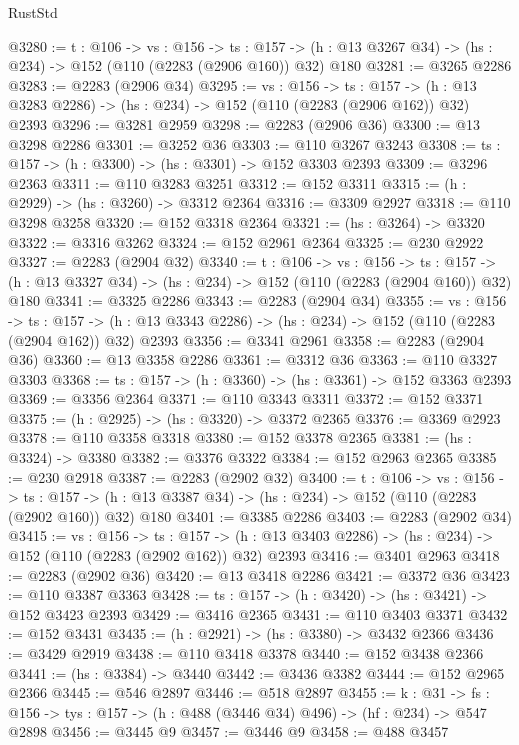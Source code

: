 \begin{lexlean}{RustStd}
\begin{coremodule}
@3280 := {t : @106} ->
  {vs : @156} ->
  {ts : @157} -> (h : @13 @3267 @34) -> (hs : @234) -> @152 (@110 (@2283 (@2906 @160)) @32) @180
@3281 := @3265 @2286
@3283 := @2283 (@2906 @34)
@3295 := {vs : @156} ->
  {ts : @157} -> (h : @13 @3283 @2286) -> (hs : @234) -> @152 (@110 (@2283 (@2906 @162)) @32) @2393
@3296 := @3281 @2959
@3298 := @2283 (@2906 @36)
@3300 := @13 @3298 @2286
@3301 := @3252 @36
@3303 := @110 @3267 @3243
@3308 := {ts : @157} -> (h : @3300) -> (hs : @3301) -> @152 @3303 @2393
@3309 := @3296 @2363
@3311 := @110 @3283 @3251
@3312 := @152 @3311
@3315 := (h : @2929) -> (hs : @3260) -> @3312 @2364
@3316 := @3309 @2927
@3318 := @110 @3298 @3258
@3320 := @152 @3318 @2364
@3321 := (hs : @3264) -> @3320
@3322 := @3316 @3262
@3324 := @152 @2961 @2364
@3325 := @230 @2922
@3327 := @2283 (@2904 @32)
@3340 := {t : @106} ->
  {vs : @156} ->
  {ts : @157} -> (h : @13 @3327 @34) -> (hs : @234) -> @152 (@110 (@2283 (@2904 @160)) @32) @180
@3341 := @3325 @2286
@3343 := @2283 (@2904 @34)
@3355 := {vs : @156} ->
  {ts : @157} -> (h : @13 @3343 @2286) -> (hs : @234) -> @152 (@110 (@2283 (@2904 @162)) @32) @2393
@3356 := @3341 @2961
@3358 := @2283 (@2904 @36)
@3360 := @13 @3358 @2286
@3361 := @3312 @36
@3363 := @110 @3327 @3303
@3368 := {ts : @157} -> (h : @3360) -> (hs : @3361) -> @152 @3363 @2393
@3369 := @3356 @2364
@3371 := @110 @3343 @3311
@3372 := @152 @3371
@3375 := (h : @2925) -> (hs : @3320) -> @3372 @2365
@3376 := @3369 @2923
@3378 := @110 @3358 @3318
@3380 := @152 @3378 @2365
@3381 := (hs : @3324) -> @3380
@3382 := @3376 @3322
@3384 := @152 @2963 @2365
@3385 := @230 @2918
@3387 := @2283 (@2902 @32)
@3400 := {t : @106} ->
  {vs : @156} ->
  {ts : @157} -> (h : @13 @3387 @34) -> (hs : @234) -> @152 (@110 (@2283 (@2902 @160)) @32) @180
@3401 := @3385 @2286
@3403 := @2283 (@2902 @34)
@3415 := {vs : @156} ->
  {ts : @157} -> (h : @13 @3403 @2286) -> (hs : @234) -> @152 (@110 (@2283 (@2902 @162)) @32) @2393
@3416 := @3401 @2963
@3418 := @2283 (@2902 @36)
@3420 := @13 @3418 @2286
@3421 := @3372 @36
@3423 := @110 @3387 @3363
@3428 := {ts : @157} -> (h : @3420) -> (hs : @3421) -> @152 @3423 @2393
@3429 := @3416 @2365
@3431 := @110 @3403 @3371
@3432 := @152 @3431
@3435 := (h : @2921) -> (hs : @3380) -> @3432 @2366
@3436 := @3429 @2919
@3438 := @110 @3418 @3378
@3440 := @152 @3438 @2366
@3441 := (hs : @3384) -> @3440
@3442 := @3436 @3382
@3444 := @152 @2965 @2366
@3445 := @546 @2897
@3446 := @518 @2897
@3455 := {k : @31} ->
  {fs : @156} -> {tys : @157} -> (h : @488 (@3446 @34) @496) -> (hf : @234) -> @547 @2898
@3456 := @3445 @9
@3457 := @3446 @9
@3458 := @488 @3457

\end{coremodule}
\end{lexlean}
